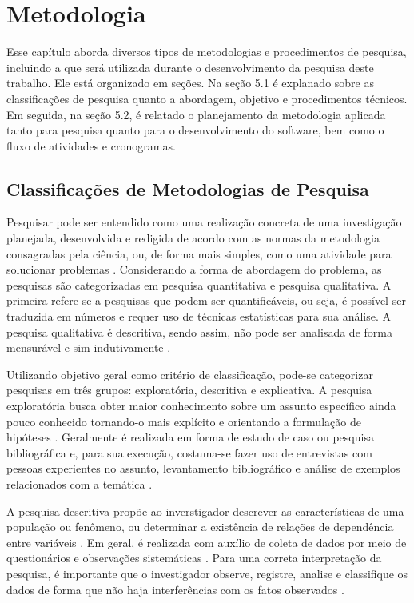 \chapter[Metodologia]{Metodologia}

Esse capítulo aborda diversos tipos de metodologias e procedimentos de pesquisa, incluindo a que será utilizada durante o desenvolvimento da pesquisa deste trabalho. Ele está organizado em seções. Na seção 5.1 é explanado sobre as classificações de pesquisa quanto a abordagem, objetivo e procedimentos técnicos. Em seguida, na seção 5.2, é relatado o planejamento da metodologia aplicada tanto para pesquisa quanto para o desenvolvimento do software, bem como o fluxo de atividades e cronogramas.

 \section{Classificações de Metodologias de Pesquisa}
  
Pesquisar pode ser entendido como uma realização concreta de uma investigação planejada, desenvolvida e redigida de acordo com as normas da metodologia consagradas pela ciência, ou, de forma mais simples, como uma atividade para solucionar problemas \cite{kauark2010} \cite{ruiz1996}. Considerando a forma de abordagem do problema, as pesquisas são categorizadas em pesquisa quantitativa e pesquisa qualitativa. A primeira refere-se a pesquisas que podem ser quantificáveis, ou seja, é possível ser traduzida em números e requer uso de técnicas estatísticas para sua análise. A pesquisa qualitativa é descritiva, sendo assim, não pode ser analisada de forma mensurável e sim indutivamente \cite{kauark2010}.

 \par
  \indent Utilizando objetivo geral como critério de classificação, pode-se categorizar pesquisas em três grupos: exploratória, descritiva e explicativa. A pesquisa exploratória busca obter maior conhecimento sobre um assunto específico ainda pouco conhecido tornando-o mais explícito e orientando a formulação de hipóteses \cite{gil2002}. Geralmente é realizada em forma de estudo de caso ou pesquisa bibliográfica \cite{rodrigues2007} e, para sua execução, costuma-se fazer uso de entrevistas com pessoas experientes no assunto, levantamento bibliográfico e análise de exemplos relacionados com a temática \cite{gil2002}. 

 \par
  \indent A pesquisa descritiva propõe ao inverstigador descrever as características de uma população ou fenômeno, ou determinar a existência de relações de dependência entre variáveis \cite{gil2002}.  Em geral, é realizada com auxílio de coleta de dados por meio de questionários e observações sistemáticas \cite{tafner2007}. Para uma correta interpretação da pesquisa, é importante que o investigador observe, registre, analise e classifique os dados de forma que não haja interferências com os fatos observados \cite{rodrigues2007}. 

